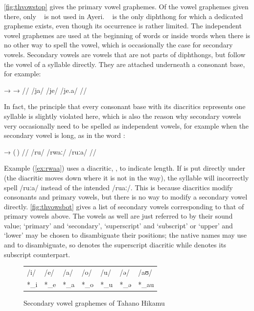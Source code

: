 \autoref{fig:thvowstop} gives the primary vowel graphemes. Of the vowel 
graphemes given there, only ~ is not used in Ayeri. 
~ is the only diphthong for which a dedicated grapheme 
exists, even though its occurrence is rather limited. The independent vowel 
graphemes are used at the beginning of words or inside words when there is no 
other way to spell the vowel, which is occasionally the case for secondary 
vowels. Secondary vowels are vowels that are not parts of diphthongs, but follow 
the vowel of a syllable directly. They are attached underneath a consonant base, 
for example:

\ex[lingstyle=thex]\begingl
	\gla {}	→		→	 //
	\glb /ja/	{}	/je/		{}	/je.a/ //
\endgl\xe

In fact, the principle that every consonant base with its diacritics represents 
one syllable is slightly violated here, which is also the reason why secondary 
vowels very occasionally need to be spelled as independent vowels, for example 
when the secondary vowel is long, as in the word :

\ex[lingstyle=thex]\label{ex:rwaa}\begingl
	\gla {}	→		\quad	(\,) //
	\glb /ru/	{}	/rwaː/ 		\quad	/ruːa/ //
\endgl\xe

Example (\ref{ex:rwaa}) uses a diacritic, , to indicate length. If 
is put directly under  (the  diacritic moves down where 
it is not in the way), the syllable will incorrectly spell /ruːa/ instead of 
the intended /ruaː/. This is because diacritics modify consonants and primary 
vowels, but there is no way to modify a secondary vowel directly. 
\autoref{fig:thvowsbot} gives a list of secondary vowels corresponding to that 
of primary vowels above. The vowels as well are just referred to by their sound 
value; `primary' and `secondary', `superscript' and `subscript' or `upper' and 
`lower' may be chosen to disambiguate their positions; the native names may use 
 and  to disambiguate, so  denotes the superscript  diacritic while  denotes its subscript counterpart.

\begin{figure}[ht]
\caption{Secondary vowel graphemes of Tahano Hikamu}

\begin{tabu} to \linewidth{X[c] X[c] X[c] X[c] X[c] X[c] X[c]}
\toprule
\tableheaderfont	/i/ & /e/ & /a/ & /o/ & /u/ & /ə/ & /aʊ/ \\
\rowfont{\Tagati\huge}	*\_i & *\_e & *\_a & *\_o & *\_u & *\_ə & *\_au \\

\bottomrule
\end{tabu}
\label{fig:thvowsbot}
\end{figure}

